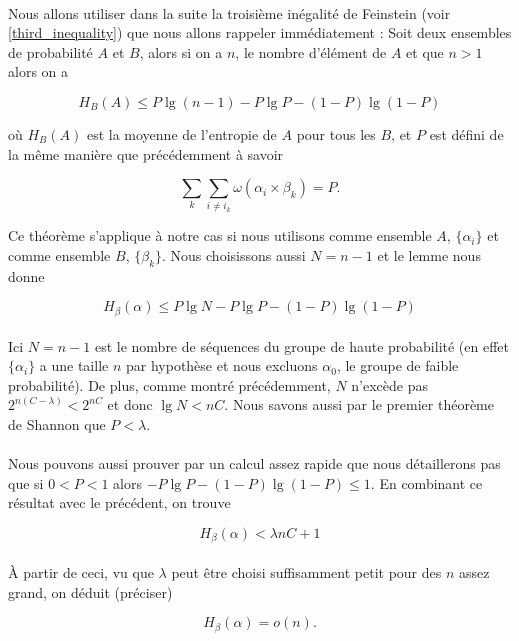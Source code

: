	\paragraph{}
	Nous allons utiliser dans la suite la troisième inégalité de Feinstein 
	(voir \ref{third_inequality}) que nous allons rappeler immédiatement :
	Soit deux ensembles de probabilité $A$ et $B$, alors si on a $n$, le 
	nombre d'élément de $A$ et que $n>1$ alors on a 
	
	\[H_B(A)\le P\lg (n-1) - P\lg P - (1-P)\lg(1-P)\]
	
	
	où $H_B(A)$ est la moyenne de l'entropie de $A$ pour tous
	les $B$, et $P$ est défini de la même manière que précédemment à savoir
	
	\[\sum_k\sum_{i\neq i_k}\omega(\alpha_i \times \beta_k) = P.\]	
	
	Ce théorème s'applique à notre cas si nous utilisons comme ensemble $A$,
	$\{\alpha_i\}$ et comme ensemble $B$, $\{\beta_k\}$. Nous choisissons
	aussi $N = n-1$ et le lemme nous donne
	
	\[H_\beta(\alpha)\le P\lg N - P\lg P - (1-P)\lg(1-P)\]
	
	\paragraph{}
	Ici $N = n-1$ est le nombre de séquences du groupe de haute probabilité 
	(en effet $\{\alpha_i\}$ a une taille $n$ par hypothèse et nous excluons
	$\alpha_0$, le groupe de faible probabilité). De plus, comme montré 
	précédemment, $N$ n'excède pas $2^{n(C-\lambda)}<2^{nC}$ et donc 
	$\lg N<nC$. Nous savons aussi par le premier théorème de Shannon 
	que $P<\lambda$.
	
	\paragraph{}
	Nous pouvons aussi prouver par un calcul assez rapide que nous détaillerons 
	pas que si $0<P<1$ alors $-P\lg P -(1-P)\lg(1-P)\le 1$. En combinant ce 
	résultat avec le précédent,	on trouve
	
	\[H_\beta(\alpha) < \lambda nC + 1\]
	
	\paragraph{}
	À partir de ceci, vu que $\lambda$ peut être choisi suffisamment petit pour
	 des $n$ assez grand, on déduit (préciser)
	
	\[H_\beta(\alpha)=o(n).\]
	
